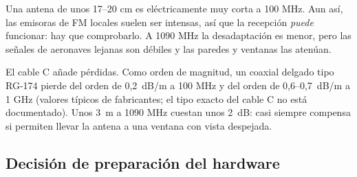 Una antena de unos 17--20 cm es eléctricamente muy corta a 100 MHz. Aun así, las emisoras de FM locales suelen ser intensas, así que la recepción \emph{puede} funcionar: hay que comprobarlo. A 1090 MHz la desadaptación es menor, pero las señales de aeronaves lejanas son débiles y las paredes y ventanas las atenúan.

El cable C añade pérdidas. Como orden de magnitud, un coaxial delgado tipo RG-174 pierde del orden de 0,2~dB/m a 100 MHz y del orden de 0,6--0,7~dB/m a 1 GHz (valores típicos de fabricantes; el tipo exacto del cable C no está documentado). Unos 3~m a 1090 MHz cuestan unos 2~dB: casi siempre compensa si permiten llevar la antena a una ventana con vista despejada.

\subsection{Decisión de preparación del hardware}
\label{sec:decision}


